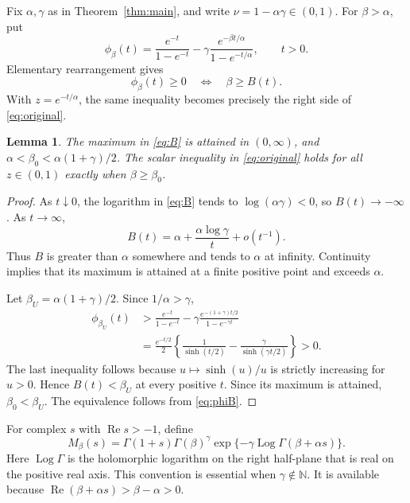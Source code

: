 \documentclass[11pt,a4paper]{article}
\numberwithin{equation}{section}
\newtheorem{lemma}[theorem]{Lemma}
\theoremstyle{definition}\newtheorem{definition}[theorem]{Definition}
\theoremstyle{remark}\newtheorem{remark}[theorem]{Remark}
\DeclareMathOperator{\Rea}{Re}
\begin{document}
Fix \(\alpha,\gamma\) as in Theorem~\ref{thm:main}, and write
\(\nu=1-\alpha\gamma\in(0,1)\). For \(\beta>\alpha\), put
\begin{equation}\label{eq:phi}
 \phi_\beta(t)=\frac{e^{-t}}{1-e^{-t}}
 -\gamma\frac{e^{-\beta t/\alpha}}{1-e^{-t/\alpha}},\qquad t>0.
\end{equation}
Elementary rearrangement gives
\begin{equation}\label{eq:phiB}
 \phi_\beta(t)\ge0\quad\Longleftrightarrow\quad\beta\ge B(t).
\end{equation}
With \(z=e^{-t/\alpha}\), the same inequality becomes precisely the
right side of \eqref{eq:original}.

\begin{lemma}\label{lem:threshold}
The maximum in \eqref{eq:B} is attained in \((0,\infty)\), and
\(\alpha<\beta_0<\alpha(1+\gamma)/2\). The scalar inequality in
\eqref{eq:original} holds for all \(z\in(0,1)\) exactly when
\(\beta\ge\beta_0\).
\end{lemma}
\begin{proof}
As \(t\downarrow0\), the logarithm in \eqref{eq:B} tends to
\(\log(\alpha\gamma)<0\), so \(B(t)\to-\infty\). As
\(t\to\infty\),
\[
 B(t)=\alpha+\frac{\alpha\log\gamma}{t}+o(t^{-1}).
\]
Thus \(B\) is greater than \(\alpha\) somewhere and tends to
\(\alpha\) at infinity. Continuity implies that its maximum is
attained at a finite positive point and exceeds \(\alpha\).

Let \(\beta_U=\alpha(1+\gamma)/2\). Since \(1/\alpha>\gamma\),
\begin{align*}
 \phi_{\beta_U}(t)
 &>\frac{e^{-t}}{1-e^{-t}}
 -\gamma\frac{e^{-(1+\gamma)t/2}}{1-e^{-\gamma t}}\\
 &=\frac{e^{-t/2}}2\left\{
 \frac1{\sinh(t/2)}-\frac\gamma{\sinh(\gamma t/2)}\right\}>0.
\end{align*}
The last inequality follows because \(u\mapsto\sinh(u)/u\) is
strictly increasing for \(u>0\). Hence \(B(t)<\beta_U\) at every
positive \(t\). Since its maximum is attained, \(\beta_0<\beta_U\).
The equivalence follows from \eqref{eq:phiB}.
\end{proof}

For complex \(s\) with \(\Rea s>-1\), define
\begin{equation}\label{eq:M}
 M_\beta(s)=\Gamma(1+s)\Gamma(\beta)^\gamma
 \exp\{-\gamma\operatorname{Log}\Gamma(\beta+\alpha s)\}.
\end{equation}
Here \(\operatorname{Log}\Gamma\) is the holomorphic logarithm on the
right half-plane that is real on the positive real axis. This convention
is essential when \(\gamma\notin\mathbb N\). It is available because
\(\Rea(\beta+\alpha s)>\beta-\alpha>0\).
\end{document}
